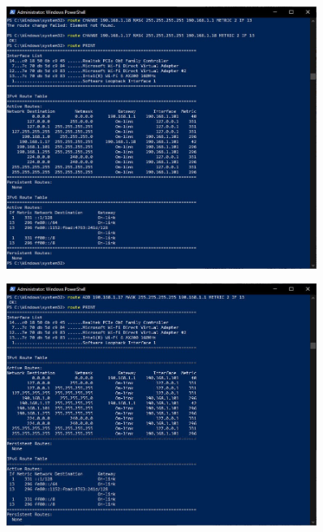 \documentclass[12pt]{extarticle}
\begin{document}
\begin{figure}[H]
    \centering
    \includegraphics[width=0.90\textwidth]{route_print}
    \caption{}
\end{figure}

\begin{figure}[H]
    \centering
    \includegraphics[width=0.90\textwidth]{route_add}
    \caption{}
\end{figure}
\end{document}
